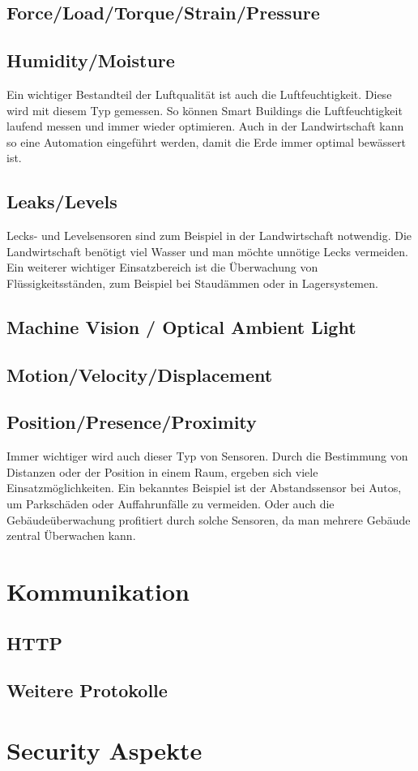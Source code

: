 \subsection{Force/Load/Torque/Strain/Pressure}

\subsection{Humidity/Moisture}
Ein wichtiger Bestandteil der Luftqualität ist auch die Luftfeuchtigkeit. Diese wird mit diesem Typ gemessen. So können Smart Buildings die Luftfeuchtigkeit laufend messen und immer wieder optimieren. Auch in der Landwirtschaft kann so eine Automation eingeführt werden, damit die Erde immer optimal bewässert ist.
\subsection{Leaks/Levels}
Lecks- und Levelsensoren sind zum Beispiel in der Landwirtschaft notwendig. Die Landwirtschaft benötigt  viel Wasser und man möchte unnötige Lecks vermeiden. Ein weiterer wichtiger Einsatzbereich ist die Überwachung von Flüssigkeitsständen, zum Beispiel bei Staudämmen oder in Lagersystemen.
\subsection{Machine Vision / Optical Ambient Light}

\subsection{Motion/Velocity/Displacement}

\subsection{Position/Presence/Proximity}
Immer wichtiger wird auch dieser Typ von Sensoren. Durch die Bestimmung von Distanzen oder der Position in einem Raum, ergeben sich viele Einsatzmöglichkeiten. Ein bekanntes Beispiel ist der Abstandssensor bei Autos, um Parkschäden oder Auffahrunfälle zu vermeiden. Oder auch die Gebäudeüberwachung profitiert durch solche Sensoren, da man mehrere Gebäude zentral Überwachen kann.
\section{Kommunikation}
\subsection{HTTP}
\subsection{Weitere Protokolle}
\section{Security Aspekte}

